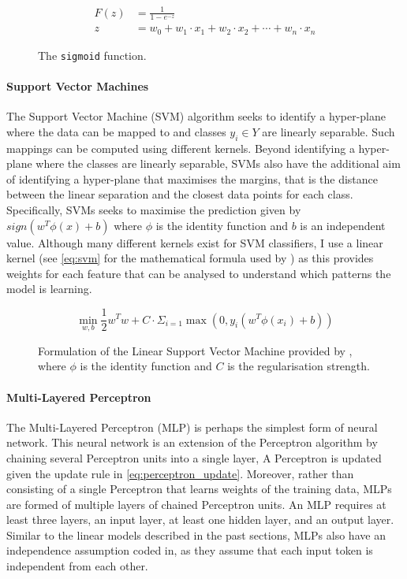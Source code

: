 \begin{figure}[h]
  \begin{align}\label{eq:sigmoid}
    F(z) &= \frac{1}{1-e^{-z}}\\
    z &= w_0 + w_1 \cdot x_1 + w_2 \cdot x_2 + \cdots + w_n \cdot x_n
  \end{align}
  \caption{The \texttt{sigmoid} function.}
\end{figure}

\paragraph{Support Vector Machines}
The Support Vector Machine (SVM) algorithm seeks to identify a hyper-plane where the data can be mapped to and classes $y_i \in Y$ are linearly separable. Such mappings can be computed using different kernels. Beyond identifying a hyper-plane where the classes are linearly separable, SVMs also have the additional aim of identifying a hyper-plane that maximises the margins, that is the distance between the linear separation and the closest data points for each class. Specifically, SVMs seeks to maximise the prediction given by $sign(w^T\phi(x)+b)$ where $\phi$ is the identity function and $b$ is an independent value.
Although many different kernels exist for SVM classifiers, I use a linear kernel (see \cref{eq:svm} for the mathematical formula used by \citet{Pedregosa:2011}) as this provides weights for each feature that can be analysed to understand which patterns the model is learning.


\begin{figure}[h]
  \begin{equation}\label{eq:svm}
    \min_{w,b} \frac{1}{2}w^T w + C\cdot \Sigma_{i=1}\max(0, y_i(w^T\phi(x_i)+b))
  \end{equation}
  \caption{Formulation of the Linear Support Vector Machine provided by \citet{Pedregosa:2011}, where $\phi$ is the identity function and $C$ is the regularisation strength.}
\end{figure}

\paragraph{Multi-Layered Perceptron}
The Multi-Layered Perceptron (MLP) is perhaps the simplest form of neural network. This neural network is an extension of the Perceptron algorithm by chaining several Perceptron units into a single layer, A Perceptron is updated given the update rule in \autoref{eq:perceptron_update}. Moreover, rather than consisting of a single Perceptron that learns weights of the training data, MLPs are formed of multiple layers of chained Perceptron units. An MLP requires at least three layers, an input layer, at least one hidden layer, and an output layer.
Similar to the linear models described in the past sections, MLPs also have an independence assumption coded in, as they assume that each input token is independent from each other.

